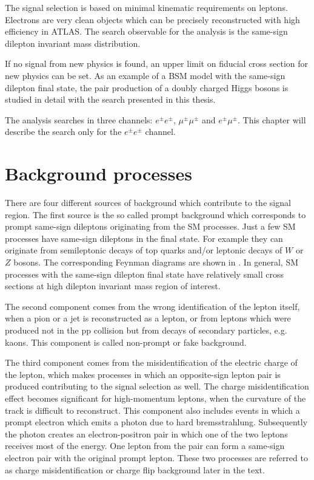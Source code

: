 The signal selection is based on minimal kinematic requirements on leptons.
Electrons are very clean objects which can be precisely reconstructed with high efficiency in ATLAS.
The search observable for the analysis is the same-sign dilepton invariant mass distribution.

If no signal from new physics is found, an upper limit on fiducial cross section for new physics can be set.
As an example of a BSM model with the same-sign dilepton final state, the pair production of a doubly charged Higgs bosons is studied in detail with the search presented in this thesis.

The analysis searches in three channels: $e^{\pm}e^{\pm}$, $\mu^{\pm}\mu^{\pm}$ and $e^{\pm}\mu^{\pm}$.
This chapter will describe the search only for the $e^{\pm}e^{\pm}$ channel.

\section{Background processes}
\label{sec:wprimeBackgrounds}

There are four different sources of background which contribute to the signal region.
The first source is the so called prompt background which corresponds to prompt same-sign dileptons originating from the SM processes.
Just a few SM processes have same-sign dileptons in the final state. 
For example they can originate from semileptonic decays of top quarks
and/or leptonic decays of $W$ or $Z$ bosons. The corresponding Feynman diagrams are shown in .
In general, SM processes with the same-sign dilepton final state have relatively small cross sections at high dilepton invariant mass region of interest.

The second component comes from the wrong identification of the lepton itself, when a pion or a jet is reconstructed as a lepton, or from leptons which were produced 
not in the pp collision but from decays of secondary particles, e.g. kaons. This component is called non-prompt or fake background.

The third component comes from the misidentification of the electric charge of the lepton, which makes processes in which an opposite-sign lepton pair is produced 
contributing to the signal selection as well. The charge misidentification effect becomes significant for high-momentum leptons, when the curvature of the track 
is difficult to reconstruct. 
This component also includes events in which a prompt electron which emits a photon due to hard bremsstrahlung. Subsequently the photon creates an electron-positron pair in which one of the two leptons receives most of the energy.
One lepton from the pair can form a same-sign electron pair with the original prompt lepton. These two processes are referred to as charge misidentification or
charge flip background later in the text.

